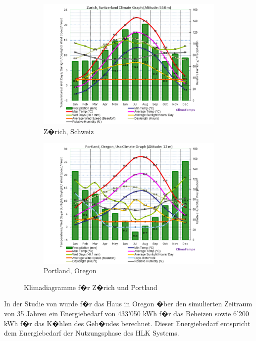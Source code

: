 \documentclass[a4paper,twoside,10pt]{report}
\begin{document}
\begin{figure}[t]
\begin{subfigure}{.5\textwidth}
  \includegraphics[width=1\linewidth]{img/zurich.pdf}
  \caption{Z�rich, Schweiz \cite{climatez}}
  \label{fig:sub_zh}
\end{subfigure}%
\begin{subfigure}{.5\textwidth}
  \includegraphics[width=1\linewidth]{img/portland.pdf}
  \caption{Portland, Oregon \cite{climatep}}
  \label{fig:sub_port}
\end{subfigure}
\caption{Klimadiagramme f�r Z�rich und Portland}
\label{fig:klima}
\end{figure}

In der Studie von \citeauthor{hvac_1} wurde f�r das Haus in Oregon �ber den simulierten Zeitraum von 
35 Jahren ein Energiebedarf von 433'050 kWh f�r das Beheizen sowie 6'200 kWh f�r das K�hlen des Geb�udes berechnet. Dieser Energiebedarf entspricht dem Energiebedarf der Nutzungsphase des \ac{HLK} Systems.
\end{document}

